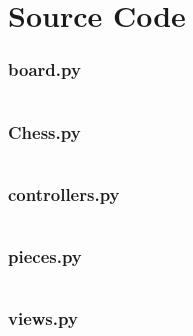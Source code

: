\section{Source Code}
\subsubsection{board.py}
\begin{longlisting}
	\inputminted[breaklines, linenos, breakanywhere, tabsize=4, baselinestretch=1.0, fontsize=\footnotesize]{python}{../src/board.py}
\end{longlisting}
\subsubsection{Chess.py}
\begin{longlisting}
	\inputminted[breaklines, linenos, breakanywhere, tabsize=4, baselinestretch=1.0, fontsize=\footnotesize]{python}{../src/Chess.py}
\end{longlisting}
\subsubsection{controllers.py}
\begin{longlisting}
	\inputminted[breaklines, linenos, breakanywhere, tabsize=4, baselinestretch=1.0, fontsize=\footnotesize]{python}{../src/controllers.py}
\end{longlisting}
\subsubsection{pieces.py}
\begin{longlisting}
	\inputminted[breaklines, linenos, breakanywhere, tabsize=4, baselinestretch=1.0, fontsize=\footnotesize]{python}{../src/pieces.py}
\end{longlisting}
\subsubsection{views.py}
\begin{longlisting}
	\inputminted[breaklines, linenos, breakanywhere, tabsize=4, baselinestretch=1.0, fontsize=\footnotesize]{python}{../src/views.py}
\end{longlisting}